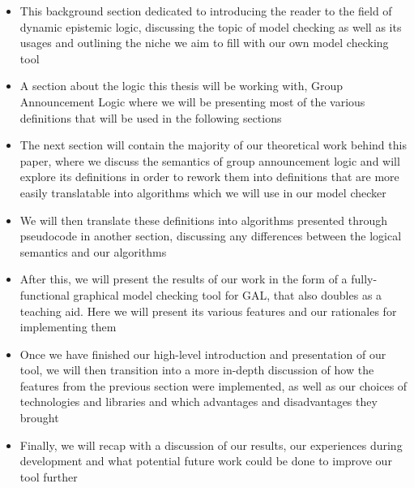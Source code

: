 \begin{itemize}
	\item{This background section dedicated to introducing the reader to the field of dynamic epistemic logic, discussing the topic of model checking as well as its usages and outlining the niche we aim to fill with our own model checking tool}
	\item{A section about the logic this thesis will be working with, Group Announcement Logic where we will be presenting most of the various definitions that will be used in the following sections}
	\item{The next section will contain the majority of our theoretical work behind this paper, where we discuss the semantics of group announcement logic and will explore its definitions in order to rework them into definitions that are more easily translatable into algorithms which we will use in our model checker}
	\item{We will then translate these definitions into algorithms presented through pseudocode in another section, discussing any differences between the logical semantics and our algorithms}
	\item{After this, we will present the results of our work in the form of a fully-functional graphical model checking tool for GAL, that also doubles as a teaching aid. Here we will present its various features and our rationales for implementing them}
	\item{Once we have finished our high-level introduction and presentation of our tool, we will then transition into a more in-depth discussion of how the features from the previous section were implemented, as well as our choices of technologies and libraries and which advantages and disadvantages they brought}
	\item{Finally, we will recap with a discussion of our results, our experiences during development and what potential future work could be done to improve our tool further}
\end{itemize}



